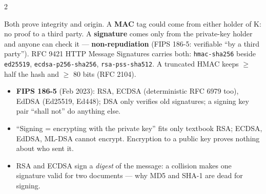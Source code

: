 \documentclass[8pt]{extarticle}
\newcommand\ct[1]{\texttt{#1}}
\newcommand\hd[1]{\par\vspace{3pt}\noindent{\bfseries\color{sheetBlue}#1}\par\vspace{1pt}}
\begin{document}
\begin{multicols}{2}
\hd{MAC vs signature — who can prove what}
Both prove integrity and origin. A \textbf{MAC} tag could come from either holder of K: no proof to a
third party. A \textbf{signature} comes only from the private-key holder and anyone can check it —
\textbf{non-repudiation} (FIPS 186-5: verifiable ``by a third party''). RFC 9421 HTTP Message
Signatures carries both: \ct{hmac-sha256} beside \ct{ed25519}, \ct{ecdsa-p256-sha256},
\ct{rsa-pss-sha512}. A truncated HMAC keeps $\ge$ half the hash and $\ge$ 80 bits (RFC 2104).
\vspace{2pt}
\noindent{}
\begin{itemize}
  \item \textbf{FIPS 186-5} (Feb 2023): RSA, ECDSA (deterministic RFC 6979 too), EdDSA (Ed25519,
        Ed448); DSA only verifies old signatures; a signing key pair ``shall not'' do anything else.
  \item ``Signing = encrypting with the private key'' fits only textbook RSA; ECDSA, EdDSA, ML-DSA
        cannot encrypt. Encryption to a public key proves nothing about who sent it.
  \item RSA and ECDSA sign a \emph{digest} of the message: a collision makes one signature valid
        for two documents — why MD5 and SHA-1 are dead for signing.
\end{itemize}


\end{multicols}
\end{document}
